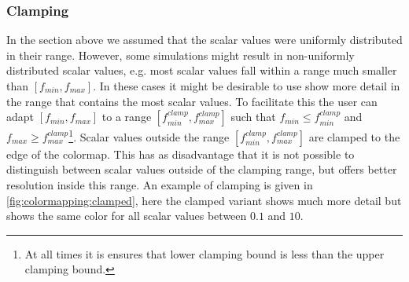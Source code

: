 \subsubsection{Clamping} %
\label{ssub:clamping}
In the section above we assumed that the scalar values were uniformly distributed in their range. However, some simulations might result in non-uniformly distributed scalar values, e.g. most scalar values fall within a range much smaller than $[f_{min}, f_{max}]$. In these cases it might be desirable to use show more detail in the range that contains the most scalar values. To facilitate this the user can adapt $[f_{min}, f_{max}]$ to a range $[f^{clamp}_{min}, f^{clamp}_{max}]$ such that $f_{min} \leq f^{clamp}_{min}$ and $f_{max} \geq f^{clamp}_{max}$\footnote{At all times it is ensures that lower clamping bound is less than the upper clamping bound.}. Scalar values outside the range $[f^{clamp}_{min}, f^{clamp}_{max}]$ are clamped to the edge of the colormap. This has as disadvantage that it is not possible to distinguish between scalar values outside of the clamping range, but offers better resolution inside this range. An example of clamping is given in \cref{fig:colormapping:clamped}, here the clamped variant shows much more detail but shows the same color for all scalar values between $0.1$ and $10$.

